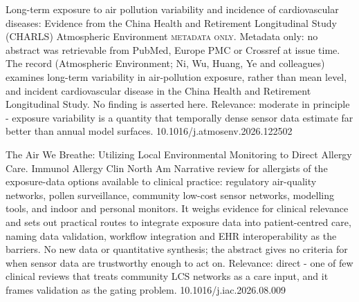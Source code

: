 \documentclass[10pt]{article}
\begin{document}
{Long-term exposure to air pollution variability and incidence of cardiovascular diseases: Evidence from the China Health and Retirement Longitudinal Study (CHARLS)}
{Atmospheric Environment}
{\textsc{metadata only.} Metadata only: no abstract was retrievable from PubMed, Europe PMC or Crossref at issue time. The record (Atmospheric Environment; Ni, Wu, Huang, Ye and colleagues) examines long-term variability in air-pollution exposure, rather than mean level, and incident cardiovascular disease in the China Health and Retirement Longitudinal Study. No finding is asserted here. Relevance: moderate in principle - exposure variability is a quantity that temporally dense sensor data estimate far better than annual model surfaces.}
{10.1016/j.atmosenv.2026.122502}

\par{}\baselineskip{}\baselineskip
{}

{The Air We Breathe: Utilizing Local Environmental Monitoring to Direct Allergy Care.}
{Immunol Allergy Clin North Am}
{Narrative review for allergists of the exposure-data options available to clinical practice: regulatory air-quality networks, pollen surveillance, community low-cost sensor networks, modelling tools, and indoor and personal monitors. It weighs evidence for clinical relevance and sets out practical routes to integrate exposure data into patient-centred care, naming data validation, workflow integration and EHR interoperability as the barriers. No new data or quantitative synthesis; the abstract gives no criteria for when sensor data are trustworthy enough to act on. Relevance: direct - one of few clinical reviews that treats community LCS networks as a care input, and it frames validation as the gating problem.}
{10.1016/j.iac.2026.08.009}

\par{}\baselineskip{}\baselineskip
{}
\end{document}
